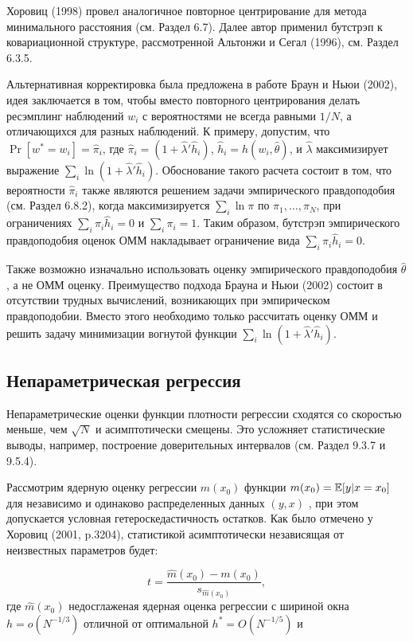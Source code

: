 Хоровиц (1998) провел аналогичное повторное центрирование для метода минимального расстояния (см. Раздел 6.7). Далее автор применил бутстрэп к ковариационной структуре, рассмотренной Альтонжи и Сегал (1996), см. Раздел 6.3.5.

Альтернативная корректировка была предложена в работе Браун и Ньюи (2002), идея заключается в том, чтобы вместо повторного центрирования делать ресэмплинг наблюдений $w_i$ с вероятностями не всегда равными $1/N$, а отличающихся для разных наблюдений. К примеру, допустим, что $\Pr[w^{*}=w_i]=\hat{\pi}_i$, где $\hat{\pi}_i=(1+\hat{\lambda}'\hat{h}_i)$, $\hat{h}_i=h(w_i,\hat{\theta})$, и $\hat{\lambda}$ максимизирует выражение $\sum_{i}\ln(1+\hat{\lambda}'\hat{h}_i)$. Обоснование такого расчета состоит в том, что вероятности $\hat{\pi}_i$ также являются решением задачи эмпирического правдоподобия (см. Раздел 6.8.2), когда максимизируется $\sum_{i}\ln{\pi}$ по $\pi_1,\ldots ,\pi_N$, при ограничениях $\sum_{i}\pi_{i}\hat{h}_i=0$ и $\sum_{i}\pi_{i}=1$. Таким образом, бутстрэп эмпирического правдоподобия оценок ОММ накладывает ограничение вида $\sum_{i}\hat{\pi}_{i}\hat{h}_{i}=0$.

Также возможно изначально использовать оценку эмпирического правдоподобия $\hat{\theta}$, а не ОММ оценку. Преимущество подхода Брауна и Ньюи (2002) состоит в отсутствии трудных вычислений, возникающих при эмпирическом правдоподобии. Вместо этого  необходимо только рассчитать оценку ОММ и решить задачу  минимизации  вогнутой функции $\sum_{i}\ln(1+\hat{\lambda}'\hat{h}_i)$. 

\subsection{Непараметрическая регрессия}

Непараметрические оценки функции плотности  регрессии сходятся со скоростью меньше, чем $\sqrt{N}$ и асимптотически смещены. Это усложняет статистические выводы, например, построение доверительных интервалов (см. Раздел 9.3.7 и 9.5.4).

Рассмотрим ядерную оценку регрессии $\hat{m}(x_0)$ функции $m(x_0)=\mathbb{E}[y|x=x_0]$ для независимо и одинаково распределенных данных $(y,x)$ , при этом допускается условная гетероскедастичность остатков. Как было отмечено у Хоровиц (2001, p.3204),  статистикой асимптотически независящая от неизвестных параметров будет:

\[
t=\dfrac{\hat{m}(x_0)-m(x_0)}{s_{\hat{m}(x_0)}},
\] 
где $\hat{m}(x_0)$ недосглаженая ядерная оценка  регрессии с шириной окна $h=o(N^{-1/3})$ отличной от оптимальной $h^{*}=O(N^{-1/5})$ и 

